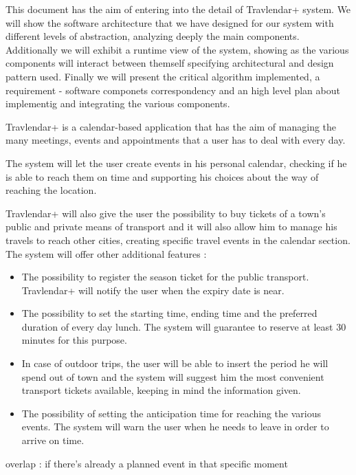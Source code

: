 \vspace*{-5mm}

This document has the aim of entering into the detail of Travlendar+ system. 
We will show the software architecture that we have designed for our system with different levels of abstraction, analyzing deeply the main components. 
Additionally we will exhibit a runtime view of the system, showing as the various components will interact between themself specifying architectural and design pattern used.
Finally we will present the critical algorithm implemented, a requirement - software componets correspondency and an high level plan about implementig and integrating the various components.

Travlendar+ is a calendar-based application that has the aim of managing the many meetings, events and appointments that a user has to deal with every day.\par
The system will let the user create events in his personal calendar, checking if he is able to reach them on time and supporting his choices about the way of reaching the location. \par
Travlendar+ will also give the user the possibility to buy tickets of a town’s public and private means of transport and it will also allow him to manage his travels to reach other cities, creating specific travel events in the calendar section.
The system will offer other additional features :
\begin{itemize}
	\setlength{\leftskip}{0.5cm}
	\item The possibility to register the season ticket for the public transport. Travlendar+ will notify the user when the expiry date is near.
	\item The possibility to set the starting time, ending time and the preferred duration of every day lunch. The system will guarantee to reserve at least 30 minutes for this purpose.
	\item In case of outdoor trips, the user will be able to insert the period he will spend out of town and the system will suggest him the most convenient transport tickets available, keeping in mind the information given.
	\item The possibility of setting the anticipation time for reaching the various events. The system will warn the user when he needs to leave in order to arrive on time.
\end{itemize}

overlap : if there’s already a planned event in that specific moment




